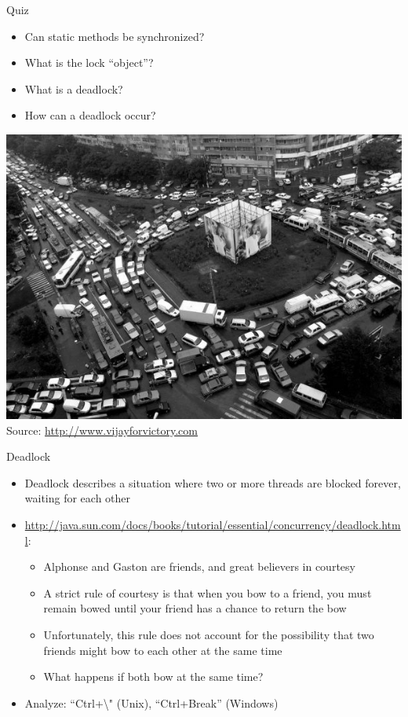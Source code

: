 \begin{frame}{Quiz}
  \begin{itemize}
  \item Can static methods be synchronized?
  \item What is the lock ``object''?
  \item What is a deadlock?
  \item How can a deadlock occur?
  \end{itemize}


  \begin{center}
    \includegraphics[scale=0.33]{figures/deadlock} \\
    \tiny{Source: \url{http://www.vijayforvictory.com}}    
  \end{center}
\end{frame}

\begin{frame}{Deadlock}
  \begin{itemize}
  \item Deadlock describes a situation where two or more threads are
    blocked forever, waiting for each other
  \item
    \url{http://java.sun.com/docs/books/tutorial/essential/concurrency/deadlock.html}:
    \begin{itemize}
    \item Alphonse and Gaston are friends, and great believers in
      courtesy
    \item A strict rule of courtesy is that when you bow to a friend,
      you must remain bowed until your friend has a chance to return
      the bow
    \item Unfortunately, this rule does not account for the
      possibility that two friends might bow to each other at the same
      time
    \item What happens if both bow at the same time?
    \end{itemize}
  \item Analyze: ``Ctrl+\textbackslash" (Unix), ``Ctrl+Break'' (Windows)
  \end{itemize}
\end{frame}


